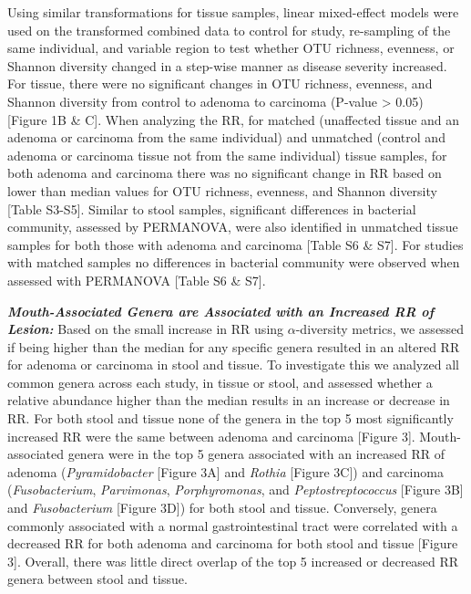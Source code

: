 \documentclass[12pt,]{article}
\begin{document}
Using similar transformations for tissue samples, linear mixed-effect
models were used on the transformed combined data to control for study,
re-sampling of the same individual, and variable region to test whether
OTU richness, evenness, or Shannon diversity changed in a step-wise
manner as disease severity increased. For tissue, there were no
significant changes in OTU richness, evenness, and Shannon diversity
from control to adenoma to carcinoma (P-value \textgreater{} 0.05)
{[}Figure 1B \& C{]}. When analyzing the RR, for matched (unaffected
tissue and an adenoma or carcinoma from the same individual) and
unmatched (control and adenoma or carcinoma tissue not from the same
individual) tissue samples, for both adenoma and carcinoma there was no
significant change in RR based on lower than median values for OTU
richness, evenness, and Shannon diversity {[}Table S3-S5{]}. Similar to
stool samples, significant differences in bacterial community, assessed
by PERMANOVA, were also identified in unmatched tissue samples for both
those with adenoma and carcinoma {[}Table S6 \& S7{]}. For studies with
matched samples no differences in bacterial community were observed when
assessed with PERMANOVA {[}Table S6 \& S7{]}.

\textbf{\emph{Mouth-Associated Genera are Associated with an Increased
RR of Lesion:}} Based on the small increase in RR using
\(\alpha\)-diversity metrics, we assessed if being higher than the
median for any specific genera resulted in an altered RR for adenoma or
carcinoma in stool and tissue. To investigate this we analyzed all
common genera across each study, in tissue or stool, and assessed
whether a relative abundance higher than the median results in an
increase or decrease in RR. For both stool and tissue none of the genera
in the top 5 most significantly increased RR were the same between
adenoma and carcinoma {[}Figure 3{]}. Mouth-associated genera were in
the top 5 genera associated with an increased RR of adenoma
(\emph{Pyramidobacter} {[}Figure 3A{]} and \emph{Rothia} {[}Figure
3C{]}) and carcinoma (\emph{Fusobacterium}, \emph{Parvimonas},
\emph{Porphyromonas}, and \emph{Peptostreptococcus} {[}Figure 3B{]} and
\emph{Fusobacterium} {[}Figure 3D{]}) for both stool and tissue.
Conversely, genera commonly associated with a normal gastrointestinal
tract were correlated with a decreased RR for both adenoma and carcinoma
for both stool and tissue {[}Figure 3{]}. Overall, there was little
direct overlap of the top 5 increased or decreased RR genera between
stool and tissue.
\end{document}
